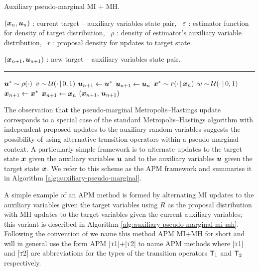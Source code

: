 \begin{algorithm}[!t]
\caption{Auxiliary pseudo-marginal MI + MH.}
\label{alg:auxiliary-pseudo-marginal-mi-mh}
\begin{algorithmic}
\small
    \Require
    $(\boldsymbol{x}_n, \boldsymbol{u}_n)$ : current target -- auxiliary variables state pair,~
    $\varepsilon$ : estimator function for density of target distribution,~
    $\rho$ : density of estimator's auxiliary variable distribution,~
    $r$ : proposal density for updates to target state.
    \Ensure\raggedright
    $(\boldsymbol{x}_{n+1}, \boldsymbol{u}_{n+1})$ : new target -- auxiliary variables state pair.
\end{algorithmic}
\hrule
\small
\begin{algorithmic}[1]
  \State $\boldsymbol{u}^* \sim \rho(\cdot)$ 
  \State $v \sim \mathcal{U}(\cdot \operatorname{|} 0,1)$
    \State $\boldsymbol{u}_{n+1} \gets \boldsymbol{u}^*$
  \Else
    \State $\boldsymbol{u}_{n+1} \gets \boldsymbol{u}_n$
  \EndIf
  \State $\boldsymbol{x}^* \sim r(\cdot \operatorname{|} \boldsymbol{x}_n)$ 
  \State $w \sim \mathcal{U}(\cdot \operatorname{|} 0,1)$
    \State $\boldsymbol{x}_{n+1} \gets \boldsymbol{x}^*$
  \Else
    \State  $\boldsymbol{x}_{n+1} \gets \boldsymbol{x}_n$
  \EndIf
  \State \Return $(\boldsymbol{x}_{n+1},\,\boldsymbol{u}_{n+1})$
\end{algorithmic}
\end{algorithm}
\vspace{-2mm}

The observation that the pseudo-marginal Metropolis--Hastings update corresponds to a special case of the standard Metropolis--Hastings algorithm with independent proposed updates to the auxiliary random variables suggests the possibility of using alternative transition operators within a pseudo-marginal context. A particularly simple framework is to alternate updates to the target state $\boldsymbol{x}$ given the auxiliary variables $\boldsymbol{u}$ and to the auxiliary variables $\boldsymbol{u}$ given the target state $\boldsymbol{x}$. We refer to this scheme as the \ac{APM} framework and summarise it in Algorithm \ref{alg:auxiliary-pseudo-marginal}.

A simple example of an \ac{APM} method is formed by alternating \ac{MI} updates to the auxiliary variables given the target variables using $R$ as the proposal distribution with \ac{MH} updates to the target variables given the current auxiliary variables; this variant is described in Algorithm \ref{alg:auxiliary-pseudo-marginal-mi-mh}. Following the convention of \citep{murray2016pseudo} we name this method \ac{APM} \ac{MI}+\ac{MH} for short and will in general use the form \ac{APM} \textsc{[t1]}+\textsc{[t2]} to name \ac{APM} methods where \textsc{[t1]} and \textsc{[t2]} are abbreviations for the types of the transition operators $\mathsf{T}_1$ and $\mathsf{T}_2$ respectively. 

